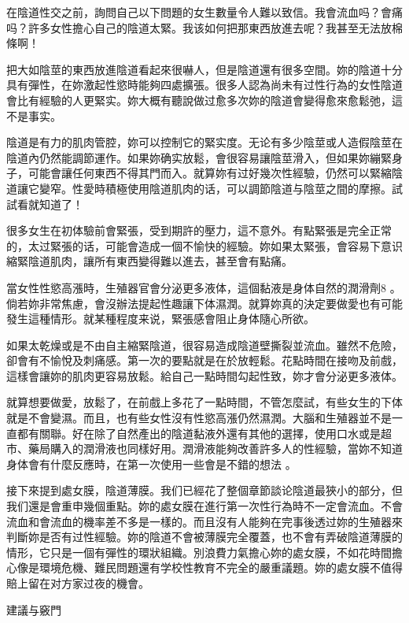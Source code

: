 \documentclass[12pt,UTF8]{ctexbook}
\begin{document}
在陰道性交之前，詢問自己以下問題的女生數量令人難以致信。我會流血吗？會痛吗？許多女性擔心自己的陰道太緊。我该如何把那東西放進去呢？我甚至无法放棉條啊！

把大如陰莖的東西放進陰道看起來很嚇人，但是陰道還有很多空間。妳的陰道十分具有彈性，在妳激起性慾時能夠四處擴張。很多人認為尚未有过性行為的女性陰道會比有經驗的人更緊实。妳大概有聽說做过愈多次妳的陰道會變得愈來愈鬆弛，這不是事实。

陰道是有力的肌肉管腔，妳可以控制它的緊实度。无论有多少陰莖或人造假陰莖在陰道內仍然能調節運作。如果妳确实放鬆，會很容易讓陰莖滑入，但如果妳繃緊身子，可能會讓任何東西不得其門而入。就算妳有过好幾次性經驗，仍然可以緊縮陰道讓它變窄。性愛時積極使用陰道肌肉的话，可以調節陰道与陰莖之間的摩擦。試試看就知道了！

很多女生在初体驗前會緊張，受到期許的壓力，這不意外。有點緊張是完全正常的，太过緊張的话，可能會造成一個不愉快的經驗。妳如果太緊張，會容易下意识縮緊陰道肌肉，讓所有東西變得難以進去，甚至會有點痛。

當女性性慾高漲時，生殖器官會分泌更多液体，這個黏液是身体自然的潤滑劑8 。倘若妳非常焦慮，會沒辦法提起性趣讓下体濕潤。就算妳真的決定要做愛也有可能發生這種情形。就某種程度来说，緊張感會阻止身体隨心所欲。

如果太乾燥或是不由自主縮緊陰道，很容易造成陰道壁撕裂並流血。雖然不危險，卻會有不愉悅及刺痛感。第一次的要點就是在於放輕鬆。花點時間在接吻及前戲，這樣會讓妳的肌肉更容易放鬆。給自己一點時間勾起性致，妳才會分泌更多液体。

就算想要做愛，放鬆了，在前戲上多花了一點時間，不管怎麼試，有些女生的下体就是不會變濕。而且，也有些女性沒有性慾高漲仍然濕潤。大腦和生殖器並不是一直都有關聯。好在除了自然產出的陰道黏液外還有其他的選擇，使用口水或是超市、藥局購入的潤滑液也同樣好用。潤滑液能夠改善許多人的性經驗，當妳不知道身体會有什麼反應時，在第一次使用一些會是不錯的想法 。

接下來提到處女膜，陰道薄膜。我们已經花了整個章節談论陰道最狹小的部分，但我们還是會重申幾個重點。妳的處女膜在進行第一次性行為時不一定會流血。不會流血和會流血的機率差不多是一樣的。而且沒有人能夠在完事後透过妳的生殖器來判斷妳是否有过性經驗。妳的陰道不會被薄膜完全覆蓋，也不會有弄破陰道薄膜的情形，它只是一個有彈性的環狀組織。別浪費力氣擔心妳的處女膜，不如花時間擔心像是環境危機、難民問題還有学校性教育不完全的嚴重議題。妳的處女膜不值得賠上留在对方家过夜的機會。





建議与竅門
\end{document}
